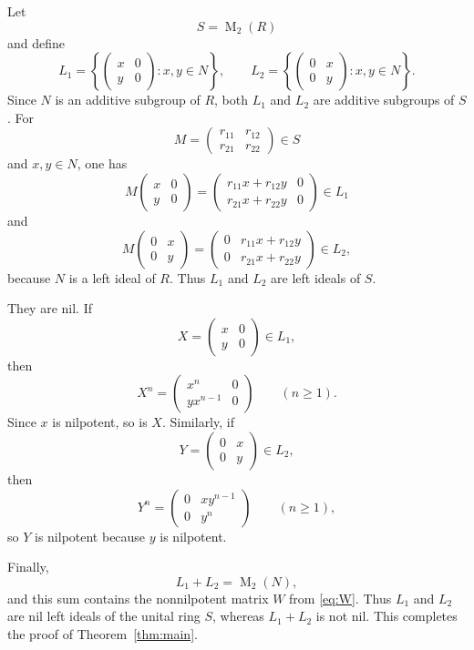 \documentclass[11pt]{article}
\newcommand{\Mat}{\operatorname{M}}
\begin{document}
Let
\[
S=\Mat_2(R)
\]
and define
\[
L_1=
\left\{
\begin{pmatrix}
x&0\\y&0
\end{pmatrix}:x,y\in N
\right\},
\qquad
L_2=
\left\{
\begin{pmatrix}
0&x\\0&y
\end{pmatrix}:x,y\in N
\right\}.
\]
Since $N$ is an additive subgroup of $R$, both $L_1$ and $L_2$ are additive subgroups of $S$.  For
\[
M=\begin{pmatrix}r_{11}&r_{12}\\r_{21}&r_{22}\end{pmatrix}\in S
\]
and $x,y\in N$, one has
\[
M\begin{pmatrix}x&0\\y&0\end{pmatrix}
=
\begin{pmatrix}r_{11}x+r_{12}y&0\\r_{21}x+r_{22}y&0\end{pmatrix}\in L_1
\]
and
\[
M\begin{pmatrix}0&x\\0&y\end{pmatrix}
=
\begin{pmatrix}0&r_{11}x+r_{12}y\\0&r_{21}x+r_{22}y\end{pmatrix}\in L_2,
\]
because $N$ is a left ideal of $R$.  Thus $L_1$ and $L_2$ are left ideals of $S$.

They are nil.  If
\[
X=
\begin{pmatrix}
x&0\\y&0
\end{pmatrix}\in L_1,
\]
then
\[
X^n=
\begin{pmatrix}
x^n&0\\yx^{n-1}&0
\end{pmatrix}
\qquad(n\ge1).
\]
Since $x$ is nilpotent, so is $X$.  Similarly, if
\[
Y=
\begin{pmatrix}
0&x\\0&y
\end{pmatrix}\in L_2,
\]
then
\[
Y^n=
\begin{pmatrix}
0&xy^{n-1}\\0&y^n
\end{pmatrix}
\qquad(n\ge1),
\]
so $Y$ is nilpotent because $y$ is nilpotent.

Finally,
\[
L_1+L_2=\Mat_2(N),
\]
and this sum contains the nonnilpotent matrix $W$ from \eqref{eq:W}.  Thus $L_1$ and $L_2$ are nil left ideals of the unital ring $S$, whereas $L_1+L_2$ is not nil.  This completes the proof of Theorem~\ref{thm:main}.
\end{document}
